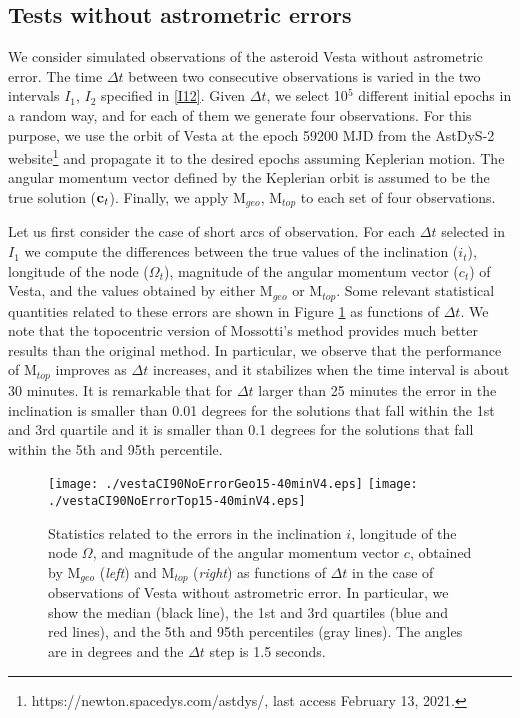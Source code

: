 \documentclass[11pt]{article}
\begin{document}
\subsection{Tests without astrometric errors}
\label{s:noerror}

We consider simulated observations of the asteroid Vesta without astrometric error. 
The time $\Delta t$ between two consecutive observations is varied in the two intervals $I_1$, $I_2$ specified in \eqref{I12}. 
Given $\Delta t$, we select 10$^5$ different initial epochs in a random way, and for each of them we generate four observations. 
For this purpose, we use the orbit of Vesta at the epoch 59200 MJD from the AstDyS-2 website\footnote{https://newton.spacedys.com/astdys/, last access February 13, 2021.} and propagate it to the desired epochs assuming Keplerian motion. 
The angular momentum vector defined by the Keplerian orbit is assumed to be the true solution (${\bf c}_t$). 
Finally, we apply M$_{geo}$, M$_{top}$ to each set of four observations.

Let us first consider the case of short arcs of observation. 
For each $\Delta t$ selected in $I_1$ we compute the differences between the true values of the inclination ($i_t$), longitude of the node ($\Omega_t$), magnitude of the angular momentum vector ($c_t$) of Vesta, and the values obtained by either M$_{geo}$ or M$_{top}$. 
Some relevant statistical quantities related to these errors are shown in Figure \ref{fig:VestaNoErr1} as functions of $\Delta t$. We note that the topocentric version of Mossotti's method provides much better results than the original method. 
In particular, we observe that the performance of M$_{top}$ improves as $\Delta t$ increases, and it stabilizes when the time interval is about 30 minutes. 
It is remarkable that for $\Delta t$ larger than 25 minutes the error in the inclination is smaller than 0.01 degrees for the solutions that fall within the 1st and 3rd quartile and it is smaller than 0.1 degrees for the solutions that fall within the 5th and 95th percentile.

\begin{figure}[ht!]
    \centering 
    \texttt{[image: ./vestaCI90NoErrorGeo15-40minV4.eps]}
    \texttt{[image: ./vestaCI90NoErrorTop15-40minV4.eps]}
    \caption{Statistics related to the errors in the inclination $i$, longitude of the node $\Omega$, and magnitude of the angular momentum vector $c$, obtained by M$_{geo}$ (\emph{left}) and M$_{top}$ (\emph{right}) as functions of $\Delta t$ in the case of observations of Vesta without astrometric error. 
    In particular, we show the median (black line), the 1st and 3rd quartiles (blue and red lines), and the 5th and 95th percentiles (gray lines). 
    The angles are in degrees { and the $\Delta t$ step is 1.5 seconds.}}
    \label{fig:VestaNoErr1}
\end{figure}
\end{document}
